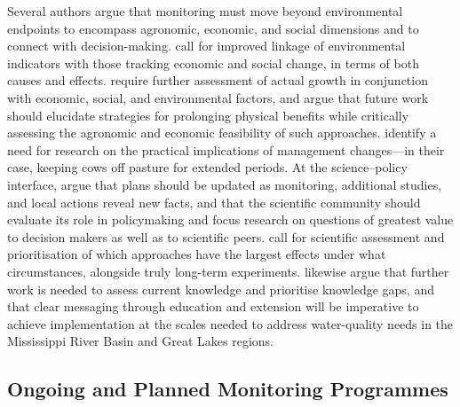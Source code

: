\documentclass[11pt]{article}
\begin{document}
Several authors argue that monitoring must move beyond environmental endpoints to encompass agronomic, economic, and social dimensions and to connect with decision-making. \textcite{Zhang2018} call for improved linkage of environmental indicators with those tracking economic and social change, in terms of both causes and effects. \textcite{Zhu2025} require further assessment of actual growth in conjunction with economic, social, and environmental factors, and \textcite{Brikmans2025} argue that future work should elucidate strategies for prolonging physical benefits while critically assessing the agronomic and economic feasibility of such approaches. \textcite{Monaghan2016} identify a need for research on the practical implications of management changes---in their case, keeping cows off pasture for extended periods. At the science--policy interface, \textcite{Letey1999} argue that plans should be updated as monitoring, additional studies, and local actions reveal new facts, and that the scientific community should evaluate its role in policymaking and focus research on questions of greatest value to decision makers as well as to scientific peers. \textcite{Clifford2023} call for scientific assessment and prioritisation of which approaches have the largest effects under what circumstances, alongside truly long-term experiments. \textcite{Kalcic2018} likewise argue that further work is needed to assess current knowledge and prioritise knowledge gaps, and that clear messaging through education and extension will be imperative to achieve implementation at the scales needed to address water-quality needs in the Mississippi River Basin and Great Lakes regions.

\subsection{Ongoing and Planned Monitoring Programmes}
\end{document}
